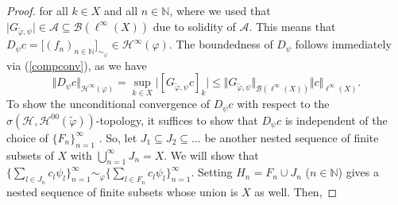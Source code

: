 \documentclass{amsart}
\def\Hil{\mathcal{H}}
\newcommand{\B}[0]{{\mathcal{B}}}
\newcommand{\N}[0]{{\mathbb{N}}}
\newcommand{\A}[0]{{\mathcal{A}}}
\begin{document}
\begin{proof}
for all $k\in X$ and all $n\in \mathbb{N}$, where we used that $\big\vert G_{\widetilde{\varphi},\psi }\big\vert \in \A \subseteq \B(\ell^{\infty}(X))$ due to solidity of $\A$. This means that $D_{\psi}c = \big[( f_n )_{n\in\N}\big]_{\sim_{\varphi}} \in \Hil^{\infty}(\varphi)$. 
  The boundedness of $D_{\psi}$ follows immediately via (\ref{compconv}), as we have 
$$\Vert D_{\psi}c \Vert_{\Hil^{\infty}(\varphi)} = \sup_{k\in X} \big\vert [G_{\widetilde{\varphi},\psi } c]_k \big\vert \leq \Vert G_{\widetilde{\varphi},\psi }\Vert_{\B(\ell^{\infty}(X))} \Vert c \Vert_{\ell^{\infty}(X)}.$$
To show the unconditional convergence of $D_{\psi}c$ with respect to the $\sigma(\Hil, \Hil^{00}(\widetilde{\varphi}))$-topology, it suffices to show that $D_{\psi}c$ is independent of the choice of $\lbrace F_n \rbrace_{n=1}^{\infty}$ \cite[Section~3.2.4]{koeba24}. %
So, let %
$J_1 \subseteq J_2\subseteq \dots$ be another nested sequence of finite subsets of $X$ with $\bigcup_{n=1}^{\infty} J_n = X$. We will show that $\lbrace \sum_{l\in J_n}c_l \psi_l \rbrace_{n=1}^{\infty} \sim_{\varphi} \lbrace \sum_{l\in F_n}c_l \psi_l \rbrace_{n=1}^{\infty}$. Setting $H_n = F_n \cup J_n$ ($n\in \mathbb{N}$) gives a nested sequence of finite subsets whose union is $X$ as well. Then, %

\end{proof}
\end{document}
